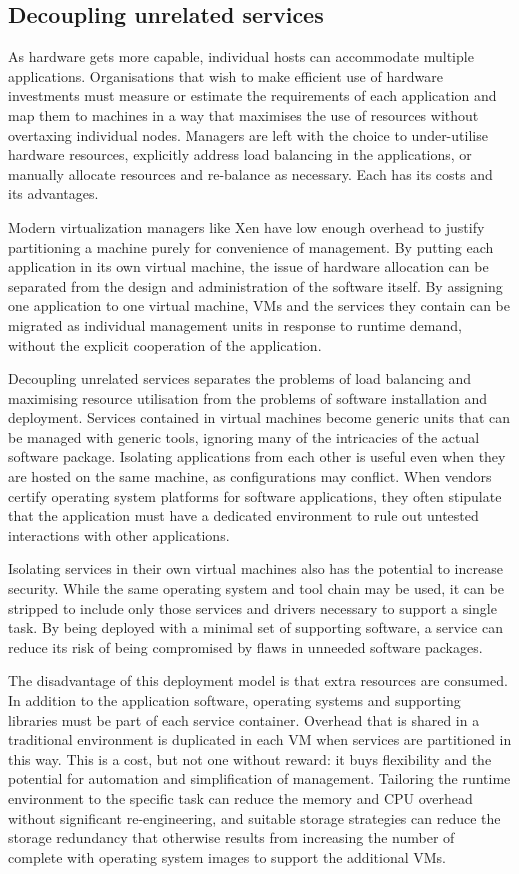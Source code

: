 \subsection{Decoupling unrelated services}

As hardware gets more capable, individual hosts can accommodate multiple applications. Organisations that wish to make efficient use of hardware investments must measure or estimate the requirements of each application and map them to machines in a way that maximises the use of resources without overtaxing individual nodes. Managers are left with the choice to under-utilise hardware resources, explicitly address load balancing in the applications, or manually allocate resources and re-balance as necessary. Each has its costs and its advantages.

Modern virtualization managers like Xen have low enough overhead to justify partitioning a machine purely for convenience of management. By putting each application in its own virtual machine, the issue of hardware allocation can be separated from the design and administration of the software itself. By assigning one application to one virtual machine, VMs and the services they contain can be migrated as individual management units in response to runtime demand, without the explicit cooperation of the application.

Decoupling unrelated services separates the problems of load balancing and maximising resource utilisation from the problems of software installation and deployment. Services contained in virtual machines become generic units that can be managed with generic tools, ignoring many of the intricacies of the actual software package. Isolating applications from each other is useful even when they are hosted on the same machine, as configurations may conflict. When vendors certify operating system platforms for software applications, they often stipulate that the application must have a dedicated environment to rule out untested interactions with other applications.

Isolating services in their own virtual machines also has the potential to increase security. While the same operating system and tool chain may be used, it can be stripped to include only those services and drivers necessary to support a single task. By being deployed with a minimal set of supporting software, a service can reduce its risk of being compromised by flaws in unneeded software packages.

The disadvantage of this deployment model is that extra resources are consumed. In addition to the application software, operating systems and supporting libraries must be part of each service container. Overhead that is shared in a traditional environment is duplicated in each VM when services are partitioned in this way. This is a cost, but not one without reward: it buys flexibility and the potential for automation and simplification of management. Tailoring the runtime environment to the specific task can reduce the memory and CPU overhead without significant re-engineering, and suitable storage strategies can reduce the storage redundancy that otherwise results from increasing the number of complete with operating system images to support the additional VMs.

